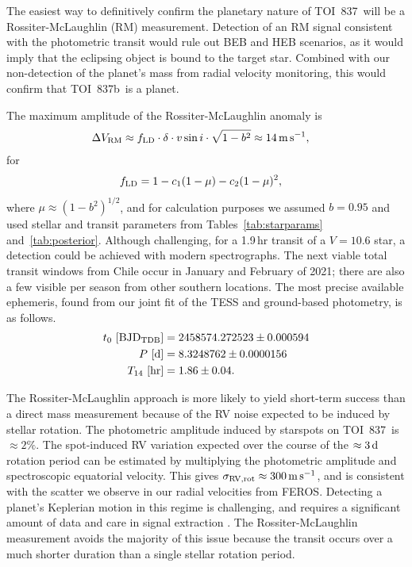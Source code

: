 \documentclass[12pt,twocolumn,tighten]{aastex63}
\newcommand{\tn}{TOI~837} %
\newcommand{\pn}{TOI~837b} %
\begin{document}
The easiest way to definitively confirm the planetary nature of \tn\
will be a Rossiter-McLaughlin (RM) measurement.  Detection of an RM
signal consistent with the photometric transit would rule out BEB and
HEB scenarios, as it would imply that the eclipsing object is bound to
the target star. Combined with our non-detection of the planet's mass
from radial velocity monitoring, this would confirm that \pn\ is a
planet.

The maximum amplitude of the Rossiter-McLaughlin anomaly is
\citep{gaudi_prospects_2007}
\begin{align}
  \Delta V_{\rm RM} &\approx f_{\rm LD} \cdot \delta \cdot v\sin i \cdot \sqrt{1-b^2}
  \approx 14\,{\rm m\,s}^{-1},
\end{align}
for
\begin{align}
  f_{\rm LD} &= 1 - c_1 ( 1 - \mu ) - c_2 (1 - \mu )^2,
\end{align}
where $\mu \approx (1 - b^2)^{1/2}$, and for calculation purposes we
assumed $b=0.95$ and used stellar and transit parameters from
Tables~\ref{tab:starparams} and~\ref{tab:posterior}.  Although
challenging, for a 1.9$\,$hr transit of a $V=10.6$ star, a detection
could be achieved with modern spectrographs.  The next viable total
transit windows from Chile occur in January and February of 2021;
there are also a few visible per season from other southern locations.
The most precise available ephemeris, found from our joint fit of the
TESS and ground-based photometry, is as follows.
\begin{align}
  t_0\ [{\rm BJD_{TDB}}] &= 2458574.272523 \pm 0.000594 \nonumber \\
  P\ [{\rm d}] &= 8.3248762 \pm 0.0000156 \nonumber \\
  T_{14}\ [{\rm hr}] &= 1.86 \pm 0.04.
  \label{eq:ephem}
\end{align}

The Rossiter-McLaughlin approach is more likely to yield short-term
success than a direct mass measurement because of the RV noise
expected to be induced by stellar rotation.  The photometric amplitude
induced by starspots on \tn\ is $\approx 2\%$.  The spot-induced RV
variation expected over the course of the $\approx 3\,{\rm d}$
rotation period can be estimated by multiplying the photometric
amplitude and spectroscopic equatorial velocity.  This gives
$\sigma_{\rm RV,rot} \approx 300\,{\rm m\,s}^{-1}$, and is consistent
with the scatter we observe in our radial velocities from FEROS.
Detecting a planet's Keplerian motion in this regime is challenging,
and requires a significant amount of data and care in signal
extraction \citep{barragan_radial_2019}.  The Rossiter-McLaughlin
measurement avoids the majority of this issue because the transit
occurs over a much shorter duration than a single stellar rotation
period.  
\end{document}
